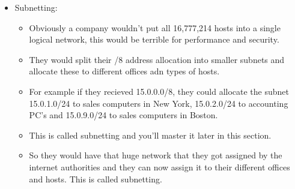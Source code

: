 \begin{itemize}
    \item Subnetting:
        \begin{itemize}
            \item Obviously a company wouldn't put all 16,777,214 hosts into a single logical network, this would be terrible for performance and security.
            \item They would split their /8 address allocation into smaller subnets and allocate these to different offices adn types of hosts.
            \item For example if they recieved 15.0.0.0/8, they could allocate the subnet 15.0.1.0/24 to sales computers in New York, 15.0.2.0/24 to accounting PC's and 15.0.9.0/24 to sales computers in Boston. 
            \item This is called subnetting and you'll master it later in this section.
            \item So they would have that huge network that they got assigned by the internet authorities and they can now assign it to their different offices and hosts. This is called subnetting.
        \end{itemize}
\end{itemize}



